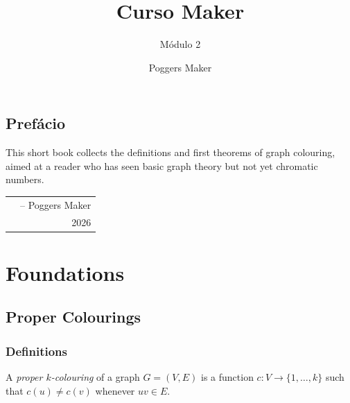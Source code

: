 \documentclass[lang=en,12pt]{beautybook}
\begin{document}
\thispagestyle{empty}
\title{Curso Maker}
\subtitle{Módulo 2}
\edition{}
\bookseries{}
\author{Poggers Maker}
\makecover

\makeatletter
{}
\oddoutermargin{\sffamily \leftmark}
\evenoutermargin{\sffamily\@title}
\makeatother


\frontmatter
{}

{\thispagestyle{empty}
\chapter*{Prefácio}
This short book collects the definitions and first theorems of graph
colouring, aimed at a reader who has seen basic graph theory but not yet
chromatic numbers.

\hfill
\begin{tabular}{lr}
    &-- Poggers Maker\\
    & 2026
\end{tabular}
\clearpage}

\thispagestyle{empty}
\tableofcontents\let\cleardoublepage\clearpage

\mainmatter
{}

\part{Foundations}

\chapter{Proper Colourings}
\label{ch:colourings}

\section{Definitions}

\begin{defi}
\label{def:colouring}
A \emph{proper $k$-colouring} of a graph $G = (V, E)$ is a function
$c \colon V \to \{1, \dots, k\}$ such that $c(u) \neq c(v)$ whenever
$uv \in E$.
\end{defi}
\end{document}
